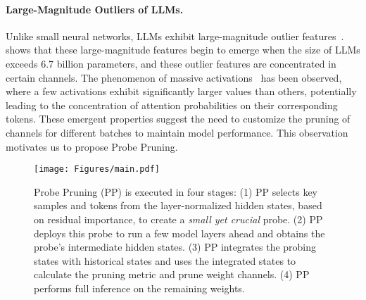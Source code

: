 \paragraph{Large-Magnitude Outliers of LLMs.} Unlike small neural networks, LLMs exhibit large-magnitude outlier features~\citep{kovaleva2021bert, dettmers2022gpt3, dettmers2023spqr, schaeffer2024emergent, sun2024massive}. \cite{dettmers2022gpt3} shows that these large-magnitude features begin to emerge when the size of LLMs exceeds 6.7 billion parameters, and these outlier features are concentrated in certain channels. The phenomenon of massive activations~\citep{sun2024massive, liu2024intactkv} has been observed, where a few activations exhibit significantly larger values than others, potentially leading to the concentration of attention probabilities on their corresponding tokens. These emergent properties suggest the need to customize the pruning of channels for different batches to maintain model performance. This observation motivates us to propose Probe Pruning.
\begin{figure*}
    \centering
    \texttt{[image: Figures/main.pdf]}
    \caption{Probe Pruning (PP) is executed in four stages: (1) PP selects key samples and tokens from the layer-normalized hidden states, based on residual importance, to create a \textit{small yet crucial} probe. (2) PP deploys this probe to run a few model layers ahead and obtains the probe's intermediate hidden states. (3) PP integrates the probing states with historical states and uses the integrated states to calculate the pruning metric and prune weight channels. (4) PP performs full inference on the remaining weights.}
    \vspace{-0.5cm}
    \label{fig:main_figure}
\end{figure*}
\vspace{-0.3cm}